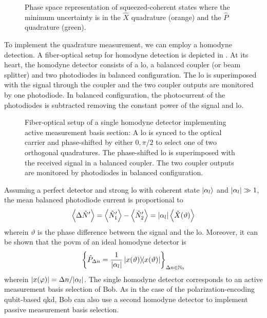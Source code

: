 \begin{figure}[htb]
	\centering
	
	\caption{Phase space representation of squeezed-coherent states where the minimum uncertainty is in the $\hat{X}$ quadrature (orange) and the $\hat{P}$ quadrature (green).}\label{fig:phase_space_squeezed}
\end{figure}
To implement the quadrature measurement, we can employ a homodyne detection.
A fiber-optical setup for homodyne detection is depicted in .
At its heart, the homodyne detector consists of a \gls{lo}, a balanced coupler (or beam splitter) and two photodiodes in balanced configuration.
The \gls{lo} is superimposed with the signal through the coupler and the two coupler outputs are monitored by one photodiode.
In balanced configuration, the photocurrent of the photodiodes is subtracted removing the constant power of the signal and \gls{lo}.
\begin{figure}[htb]
	\centering
	
	\caption{Fiber-optical setup of a single homodyne detector implementing active measurement basis section: A \gls{lo} is synced to the optical carrier and phase-shifted by either $0,\pi/2$ to select one of two orthogonal quadratures. The phase-shifted \gls{lo} is superimposed with the received signal in a balanced coupler. The two coupler outputs are monitored by photodiodes in balanced configuration.}\label{fig:coherent_receiver_active}
\end{figure}
Assuming a perfect detector and strong \gls{lo} with coherent state $\ket{\alpha_l}$ and $\abs{\alpha_l}\gg1$, the mean balanced photodiode current is proportional to~\cite[p.~217]{Vogel2006}
\begin{equation*}
	\expval{\Delta\hat{N}^\prime}
	=
	\expval{\hat{N}_1^\prime}
	-
	\expval{\hat{N}_2^\prime}
	=
	\abs{\alpha_l}
	\expval{\hat{X}(\vartheta)}
\end{equation*}
wherein $\vartheta$ is the phase difference between the signal and the \gls{lo}.
Moreover, it can be shown that the \gls{povm} of an ideal homodyne detector is~\cite[p.~220]{Vogel2006}
\begin{equation}
	\left\{\hat{P}_{\Delta n}=\frac{1}{\abs{\alpha_l}}\ketbra{x(\vartheta)}\right\}_{\Delta n\in\mathbb{N}_0}
\end{equation}
wherein $\abs{x(\varphi)}=\Delta n/\abs{\alpha_l}$.
The single homodyne detector corresponds to an active measurement basis selection of Bob.
As in the case of the polarization-encoding qubit-based \gls{qkd}, Bob can also use a second homodyne detector to implement passive measurement basis selection.
